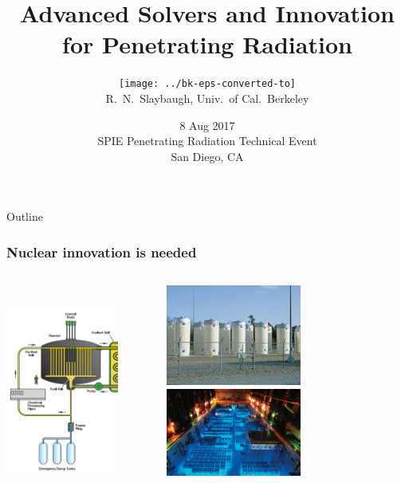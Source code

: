 \documentclass[xcolor=x11names,compress]{beamer}
\title{Advanced Solvers and Innovation for Penetrating Radiation}
\author{\texttt{[image: ../bk-eps-converted-to]}\\R.\ N.\ Slaybaugh, Univ.\ of Cal.\ Berkeley
}
\date{8 Aug 2017 \\ SPIE Penetrating Radiation Technical Event \\ San Diego, CA}
\renewcommand{\(}{\begin{columns}}
\renewcommand{\)}{\end{columns}}
\newcommand{\<}[1]{\begin{column}{#1}}
\renewcommand{\>}{\end{column}}
\begin{document}
\begin{frame}
\titlepage
\end{frame}

\begin{frame}[fragile]{Outline}
  \frametitle{Nuclear innovation is needed}

\begin{columns}
  \begin{column}{0.5\textwidth}
  		\includegraphics[height=2.75in,clip]{../figs/msr-core-diagram}
  \end{column}
  \begin{column}{0.5\textwidth}
        \renewcommand*{\thesubfigure}{}
      \begin{figure}[htp]
        \centering
        \includegraphics[width=1.75in]{../figs/isfsi}

        \includegraphics[width=1.75in]{../figs/spent-fuel-pool}
      \end{figure}    
  \end{column}
\end{columns}

\end{frame}
\end{document}
